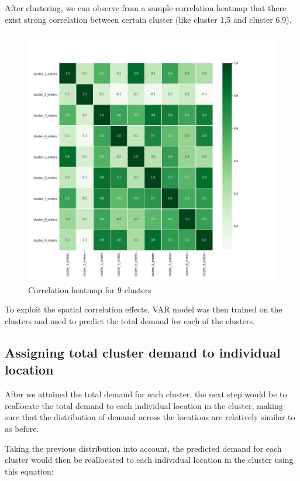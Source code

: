 \documentclass[12pt, letterpaper] {article}
\begin{document}
After clustering, we can observe from a sample correlation heatmap that there exist strong correlation between certain cluster (like cluster 1,5 and cluster 6,9). 

\begin{figure}[H]
    \centering
    \includegraphics[width=\textwidth, height=0.8\textheight]{Images/cluster_corr_heatmap.jpg}
    \caption{Correlation heatmap for 9 clusters}
    \label{fig:Correlation heatmap for 9 clusters}
\end{figure}

\noindent To exploit the spatial correlation effects, VAR model was then trained on the clusters and used to predict the total demand for each of the clusters. 

\subsection{Assigning total cluster demand to individual location}

After we attained the total demand for each cluster, the next step would be to reallocate the total demand to each individual location in the cluster, making sure that the distribution of demand across the locations are relatively similar to as before. 

\noindent Taking the previous distribution into account, the predicted demand for each cluster would then be reallocated to each individual location in the cluster using this equation:
\end{document}
